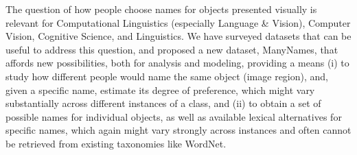 The question of how people choose names for objects presented visually is relevant for Computational Linguistics (especially Language \& Vision), Computer Vision, Cognitive Science, and Linguistics.
We have surveyed datasets that can be useful to address this question, and proposed a new dataset, ManyNames, that affords new possibilities, both for analysis and modeling, providing a means
(i) to study how different people would name the same object (image region), and, given a specific name, estimate its degree of preference, which might vary substantially across different instances of a class, and   
(ii) to obtain a set of possible names for individual objects, as well as available lexical alternatives for specific names, which again might vary strongly across instances and often cannot be retrieved from existing taxonomies like WordNet. 

